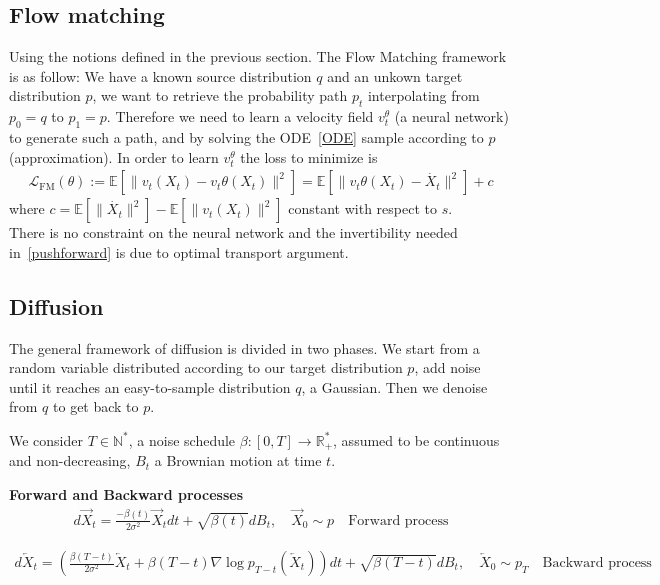 \documentclass{article}
\begin{document}
\subsection{Flow matching}

Using the notions defined in the previous section. The Flow Matching framework is as follow: 
We have a known source distribution \(q\) and an unkown target distribution \(p\), we want to retrieve the probability path \(p_t\) interpolating from \(p_0=q\) to \(p_1=p\). Therefore we need to learn a velocity field \(v_t^\theta\) (a neural network) to generate such a path, and by solving the ODE~\ref{ODE} sample according to \(p\) (approximation). In order to learn \(v_t^\theta\) the loss to minimize is 
\begin{align}
    \mathcal{L}_\text{FM}(\theta):=\mathbb{E}[\|v_t(X_t)-v_t\theta(X_t)\|^2]= \mathbb{E}[\|v_t\theta(X_t)-\dot{X_t}\|^2] + c
\end{align} 
where \(c = \mathbb{E}[\|\dot{X_t}\|^2]-\mathbb{E}[\|v_t(X_t)\|^2]\) constant with respect to \(s\). \\
There is no constraint on the neural network and the invertibility needed in~\ref{pushforward} is due to optimal transport argument.

\subsection{Diffusion}
The general framework of diffusion is divided in two phases. We start from a random variable distributed according to our target distribution \( p \), add noise until it reaches an easy-to-sample distribution \(q\), a Gaussian. Then we denoise from \(q\) to get back to \(p\). 

\bigskip

We consider \(T\in\mathbb{N}^{*}\), a noise schedule \(\beta:[0,T]\rightarrow \mathbb{R}_{+}^{*}\), assumed to be continuous and non-decreasing, \(B_t\) a Brownian motion at time \(t\).

\textbf{Forward and Backward processes}
\begin{align}
    d\overrightarrow{X}_t = \frac{-\beta(t)}{2\sigma^2}\overrightarrow{X}_t dt + \sqrt{\beta(t)}dB_t, \quad \overrightarrow{X}_0\sim p 
    \quad \text{Forward process}
\end{align} 

\begin{align}
    d\overleftarrow{X}_t=\left(  \frac{\beta(T-t)}{2\sigma^2}\overleftarrow{X}_t+\beta(T-t)\nabla\log p_{T-t}\left(\overleftarrow{X}_t \right)  \right)dt + \sqrt{\beta(T-t)}dB_t, \quad \overleftarrow{X}_0\sim p_T \quad \text{Backward process}
\end{align}
\end{document}
